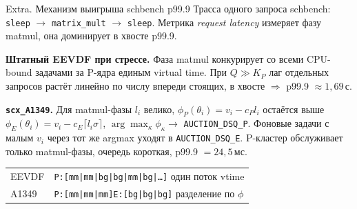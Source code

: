 \documentclass[aspectratio=169,11pt]{beamer}
\begin{document}
\begin{frame}{Extra. Механизм выигрыша schbench p99.9}
        \footnotesize
        Трасса одного запроса schbench: \texttt{sleep} $\to$
        \texttt{matrix\_mult} $\to$ \texttt{sleep}. Метрика
        \textit{request latency} измеряет фазу matmul, она доминирует
        в хвосте p99.9.

        \vspace{0.3em}
        \begin{shadowbox2}
                \textbf{Штатный EEVDF при стрессе.}
                Фаза matmul конкурирует со всеми CPU-bound задачами
                за P-ядра единым virtual time. При $Q \gg K_P$
                лаг отдельных запросов растёт линейно по числу
                впереди стоящих, в хвосте $\Rightarrow$ p99.9
                $\approx 1{,}69$\,с.
        \end{shadowbox2}

        \vspace{0.3em}
        \begin{shadowbox2}
                \textbf{\texttt{scx\_A1349}.}
                Для matmul-фазы $l_i$ велико, $\phi_P(\theta_i) = v_i
                - c_P l_i$ остаётся выше $\phi_E(\theta_i) = v_i -
                c_E\lceil l_i\sigma\rceil$, $\arg\max_\kappa
                \phi_\kappa \to$ \texttt{AUCTION\_DSQ\_P}. Фоновые
                задачи с малым $v_i$ через тот же argmax уходят в
                \texttt{AUCTION\_DSQ\_E}. P-кластер обслуживает
                только matmul-фазы, очередь короткая,
                p99.9 $= 24{,}5$\,мс.
        \end{shadowbox2}

        \vspace{0.3em}
        \begin{shadowbox}
                \scriptsize
                \begin{tabular}{l|l}
                        EEVDF & \texttt{P:[mm|mm|bg|bg|mm|bg|\ldots]} один поток vtime\\
                        A1349 & \texttt{P:[mm|mm|mm]\quad E:[bg|bg|bg]} разделение по $\phi$
                \end{tabular}
        \end{shadowbox}
\end{frame}
\addtocounter{framenumber}{-1}
\end{document}
